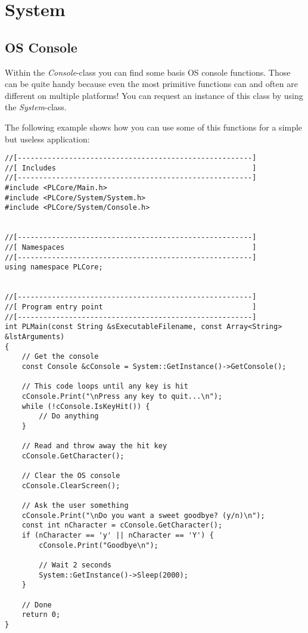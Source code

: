 \section{System}




\subsection{\ac{OS} Console}
Within the \emph{Console}-class you can find some basis \ac{OS} console functions. Those can be quite handy because even the most primitive functions can and often are different on multiple platforms! You can request an instance of this class by using the \emph{System}-class.

The following example shows how you can use some of this functions for a simple but useless application:

\begin{lstlisting}[caption=\ac{OS} console usage example]
//[-------------------------------------------------------]
//[ Includes                                              ]
//[-------------------------------------------------------]
#include <PLCore/Main.h>
#include <PLCore/System/System.h>
#include <PLCore/System/Console.h>


//[-------------------------------------------------------]
//[ Namespaces                                            ]
//[-------------------------------------------------------]
using namespace PLCore;


//[-------------------------------------------------------]
//[ Program entry point                                   ]
//[-------------------------------------------------------]
int PLMain(const String &sExecutableFilename, const Array<String> &lstArguments)
{
	// Get the console
	const Console &cConsole = System::GetInstance()->GetConsole();

	// This code loops until any key is hit
	cConsole.Print("\nPress any key to quit...\n");
	while (!cConsole.IsKeyHit()) {
		// Do anything
	}

	// Read and throw away the hit key
	cConsole.GetCharacter();

	// Clear the OS console
	cConsole.ClearScreen();

	// Ask the user something
	cConsole.Print("\nDo you want a sweet goodbye? (y/n)\n");
	const int nCharacter = cConsole.GetCharacter();
	if (nCharacter == 'y' || nCharacter == 'Y') {
		cConsole.Print("Goodbye\n");

		// Wait 2 seconds
		System::GetInstance()->Sleep(2000);
	}

	// Done
	return 0;
}
\end{lstlisting}
